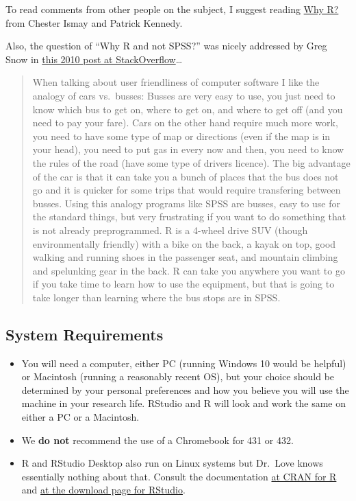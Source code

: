 \documentclass[
]{book}
\providecommand{\tightlist}{%
  \setlength{\itemsep}{0pt}\setlength{\parskip}{0pt}}
\begin{document}
To read comments from other people on the subject, I suggest reading \href{https://rbasics.netlify.com/2-whyr}{Why R?} from Chester Ismay and Patrick Kennedy.

Also, the question of ``Why R and not SPSS?'' was nicely addressed by Greg Snow in \href{https://stackoverflow.com/questions/3787231/r-and-spss-difference}{this 2010 post at StackOverflow}\ldots{}

\begin{quote}
When talking about user friendliness of computer software I like the analogy of cars vs.~busses: Busses are very easy to use, you just need to know which bus to get on, where to get on, and where to get off (and you need to pay your fare). Cars on the other hand require much more work, you need to have some type of map or directions (even if the map is in your head), you need to put gas in every now and then, you need to know the rules of the road (have some type of drivers licence). The big advantage of the car is that it can take you a bunch of places that the bus does not go and it is quicker for some trips that would require transfering between busses. Using this analogy programs like SPSS are busses, easy to use for the standard things, but very frustrating if you want to do something that is not already preprogrammed. R is a 4-wheel drive SUV (though environmentally friendly) with a bike on the back, a kayak on top, good walking and running shoes in the passenger seat, and mountain climbing and spelunking gear in the back. R can take you anywhere you want to go if you take time to learn how to use the equipment, but that is going to take longer than learning where the bus stops are in SPSS.
\end{quote}

\hypertarget{system-requirements-1}{%
\subsection{System Requirements}\label{system-requirements-1}}

\begin{itemize}
\tightlist
\item
  You will need a computer, either PC (running Windows 10 would be helpful) or Macintosh (running a reasonably recent OS), but your choice should be determined by your personal preferences and how you believe you will use the machine in your research life. RStudio and R will look and work the same on either a PC or a Macintosh.
\item
  We \textbf{do not} recommend the use of a Chromebook for 431 or 432.
\item
  R and RStudio Desktop also run on Linux systems but Dr.~Love knows essentially nothing about that. Consult the documentation \href{https://cran.r-project.org/}{at CRAN for R} and \href{https://rstudio.com/products/rstudio/download/\#download}{at the download page for RStudio}.
\end{itemize}
\end{document}
